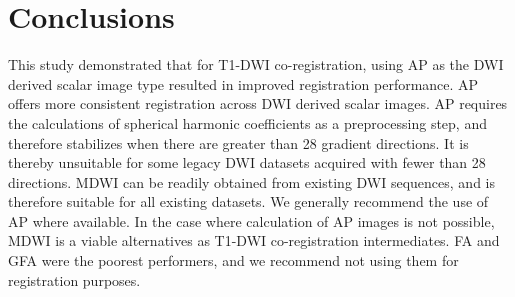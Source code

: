 \section{Conclusions}
This study demonstrated that for T1-DWI co-registration, using AP as the DWI derived scalar image type resulted in improved registration performance. AP offers more consistent registration across DWI derived scalar images. AP requires the calculations of spherical harmonic coefficients as a preprocessing step, and therefore stabilizes when there are greater than 28 gradient directions. It is thereby unsuitable for some legacy DWI datasets acquired with fewer than 28 directions. MDWI can be readily obtained from existing DWI sequences, and is therefore suitable for all existing datasets. We generally recommend the use of AP where available. In the case where calculation of AP images is not possible, MDWI is a viable alternatives as T1-DWI co-registration intermediates. FA and GFA were the poorest performers, and we recommend not using them for registration purposes.

